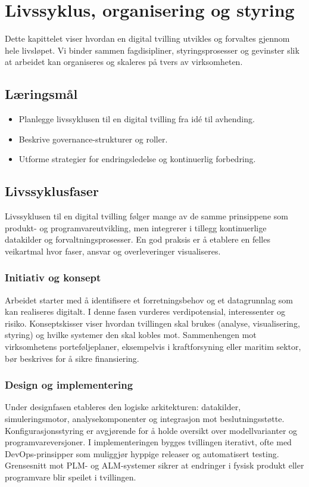 \chapter{Livssyklus, organisering og styring}


Dette kapittelet viser hvordan en digital tvilling utvikles og forvaltes gjennom hele livsløpet. Vi binder sammen fagdisipliner, styringsprosesser og gevinster slik at arbeidet kan organiseres og skaleres på tvers av virksomheten.

\section{Læringsmål}
\begin{itemize}
    \item Planlegge livssyklusen til en digital tvilling fra idé til avhending.
    \item Beskrive governance-strukturer og roller.
    \item Utforme strategier for endringsledelse og kontinuerlig forbedring.
\end{itemize}

\section{Livssyklusfaser}
Livssyklusen til en digital tvilling følger mange av de samme prinsippene som produkt- og programvareutvikling, men integrerer i tillegg kontinuerlige datakilder og forvaltningsprosesser. En god praksis er å etablere en felles veikartmal hvor faser, ansvar og overleveringer visualiseres.

\subsection*{Initiativ og konsept}
Arbeidet starter med å identifisere et forretningsbehov og et datagrunnlag som kan realiseres digitalt. I denne fasen vurderes verdipotensial, interessenter og risiko. Konseptskisser viser hvordan tvillingen skal brukes (analyse, visualisering, styring) og hvilke systemer den skal kobles mot. Sammenhengen mot virksomhetens porteføljeplaner, eksempelvis i kraftforsyning eller maritim sektor, bør beskrives for å sikre finansiering.

\subsection*{Design og implementering}
Under designfasen etableres den logiske arkitekturen: datakilder, simuleringsmotor, analysekomponenter og integrasjon mot beslutningsstøtte. Konfigurasjonsstyring er avgjørende for å holde oversikt over modellvarianter og programvareversjoner. I implementeringen bygges tvillingen iterativt, ofte med DevOps-prinsipper som muliggjør hyppige releaser og automatisert testing. Grensesnitt mot PLM- og ALM-systemer sikrer at endringer i fysisk produkt eller programvare blir speilet i tvillingen.

